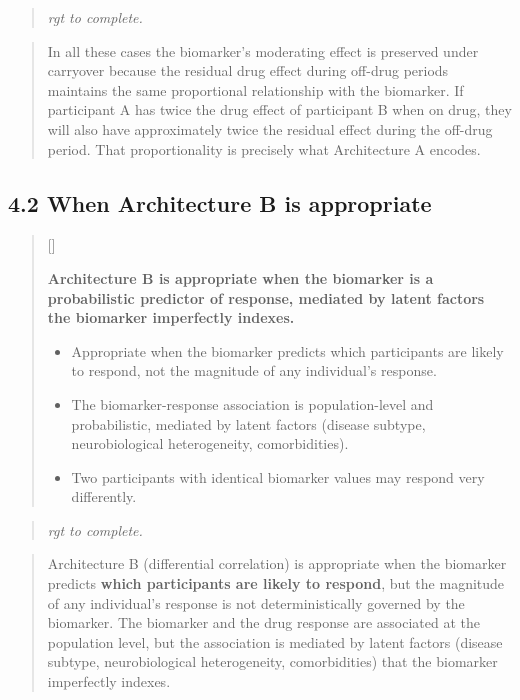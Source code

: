 \documentclass[
  11pt,
]{article}
\newcounter{pgraph}
\newenvironment{bullets}{%
  \stepcounter{pgraph}%
  \begin{quote}\small\sffamily\color[gray]{0.30}%
  {\normalfont\scriptsize\color[gray]{0.58}[\thepgraph]\enspace}}{%
  \end{quote}}
\newenvironment{rgt}{%
  \begin{quote}\small\itshape\color[RGB]{20,60,160}}{%
  \end{quote}}
\newenvironment{orig}{%
  \begin{quote}\normalsize\color[gray]{0.55}}{%
  \end{quote}}
\begin{document}
\begin{rgt}
rgt to complete.

\end{rgt}

\begin{orig}
In all these cases the biomarker's moderating effect is preserved under
carryover because the residual drug effect during off-drug periods
maintains the same proportional relationship with the biomarker. If
participant A has twice the drug effect of participant B when on drug,
they will also have approximately twice the residual effect during the
off-drug period. That proportionality is precisely what Architecture A
encodes.

\end{orig}

\subsection{4.2 When Architecture B is appropriate}

\begin{bullets}

\textbf{Architecture B is appropriate when the biomarker is a
probabilistic predictor of response, mediated by latent
factors the biomarker imperfectly indexes.}

\begin{itemize}\setlength{\itemsep}{2pt}\setlength{\parskip}{0pt}
\item Appropriate when the biomarker predicts which participants
  are likely to respond, not the magnitude of any individual's
  response.
\item The biomarker-response association is population-level and
  probabilistic, mediated by latent factors (disease subtype,
  neurobiological heterogeneity, comorbidities).
\item Two participants with identical biomarker values may
  respond very differently.
\end{itemize}

\end{bullets}

\begin{rgt}
rgt to complete.

\end{rgt}

\begin{orig}
Architecture B (differential correlation) is appropriate when the
biomarker predicts \textbf{which participants are likely to
respond}, but the magnitude of any individual's response is not
deterministically governed by the biomarker. The biomarker and the drug
response are associated at the population level, but the association is
mediated by latent factors (disease subtype, neurobiological
heterogeneity, comorbidities) that the biomarker imperfectly indexes.

\end{orig}
\end{document}
